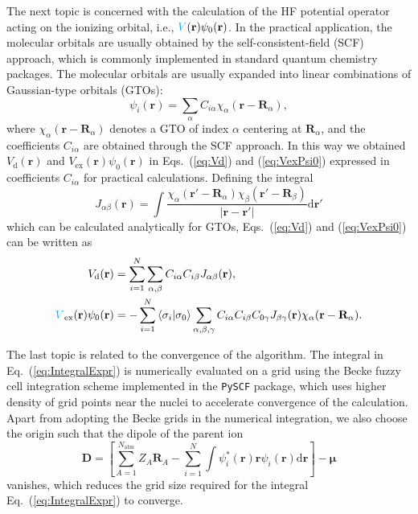 \documentclass[preprint,12pt]{elsarticle} %
\newcommand{\bn}[1]{\mathbf{#1}}    %
\newcommand{\bi}[1]{\bm{#1}}        %
\renewcommand{\rm}[1]{\mathrm{#1}}    %
\newcommand{\dd}{\mathrm{d}}    %
\newcommand{\abs}[1]{\lvert #1 \rvert}  %
\newcommand{\cyan}[1]{\textcolor{cyan}{#1}}     %
\begin{document}
The next topic is concerned with the calculation of the HF potential operator acting on the ionizing orbital, i.e., $\cyan{V}(\bn{r}) \psi_0(\bn{r})$. In the practical application, the molecular orbitals are usually obtained by the self-consistent-field (SCF) approach, which is commonly implemented in standard quantum chemistry packages. The molecular orbitals are usually expanded into linear combinations of Gaussian-type orbitals (GTOs):
\begin{equation}
    \psi_i(\bn{r})=\sum_\alpha C_{i \alpha} \chi_\alpha(\bn{r}-\bn{R}_\alpha),
\end{equation}
where $\chi_\alpha(\bn{r}-\bn{R}_\alpha)$ denotes a GTO of index $\alpha$ centering at $\bn{R}_\alpha$, and the coefficients $C_{i \alpha}$ are obtained through the SCF approach.
In this way we obtained $V_{\rm{d}}(\bn{r})$ and $V_{\rm{ex}}(\bn{r})\psi_0(\bn{r})$ in Eqs.~(\ref{eq:Vd}) and (\ref{eq:VexPsi0}) expressed in coefficients $C_{i \alpha}$ for practical calculations. Defining the integral
\begin{equation}
    J_{\alpha\beta}(\bn{r}) = \int \frac{\chi_\alpha(\bn{r}'-\bn{R}_\alpha) \chi_\beta(\bn{r}'-\bn{R}_\beta)}{\abs{\bn{r}-\bn{r}'}} \dd \bn{r}'
\end{equation}
which can be calculated analytically for GTOs,
Eqs.~(\ref{eq:Vd}) and (\ref{eq:VexPsi0}) can be written as
\begin{align}
     V_{\rm{d}}(\bn{r}) &= \sum_{i=1}^{N} \sum_{\alpha,\beta} C_{i\alpha} C_{i\beta} J_{\alpha\beta}(\bn{r}), \\
     \cyan{V}_{\rm{ex}}(\bn{r})\psi_0(\bn{r}) &= - \sum_{i=1}^{N} \braket{\sigma_i | \sigma_0} \sum_{\alpha,\beta,\gamma} C_{i\alpha} C_{i\beta} C_{0\gamma} J_{\beta\gamma}(\bn{r}) \chi_\alpha(\bn{r}-\bn{R}_\alpha).
\end{align}

The last topic is related to the convergence of the algorithm. The integral in Eq.~(\ref{eq:IntegralExpr}) is numerically evaluated on a grid using the Becke fuzzy cell integration scheme \cite{becke_multicenter_1988} implemented in the \texttt{PySCF} package, which uses higher density of grid points near the nuclei to accelerate convergence of the calculation. Apart from adopting the Becke grids in the numerical integration, we also choose the origin such that the dipole of the parent ion
\begin{equation}
    \bn{D} = \left[\sum_{A=1}^{N_{\rm{atm}}} Z_A \bn{R}_A - \sum_{i=1}^N \int \psi_i^*(\bn{r}) \bn{r} \psi_i(\bn{r}) \dd \bn{r} \right] - \bi{\mu}
    \label{eq:ParentIonDipole}
\end{equation}
vanishes, which reduces the grid size required for the integral Eq.~(\ref{eq:IntegralExpr}) to converge.
\end{document}
